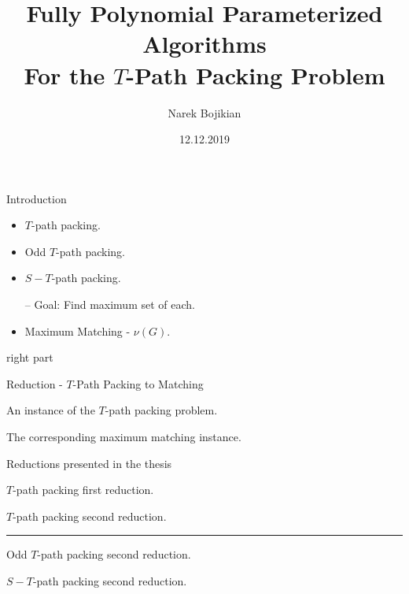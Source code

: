 \documentclass{beamer}
\title{Fully Polynomial Parameterized Algorithms\\For the $T$-Path Packing Problem} %
\author{Narek Bojikian} %
\institute[Hu-Berlin]
{
	Humboldt University of Berlin
}
\date{12.12.2019} %
\begin{document}
\begin{frame}
\titlepage %
\end{frame}
\begin{frame}[t]{Introduction}
	\vspace{10px}
	\begin{minipage}[t]{0.6\linewidth}
		\begin{itemize}[<+->]
			\item $T$-path packing.
			\item Odd $T$-path packing.
			\item $S-T$-path packing.
			\item[--] Goal: Find maximum set of each.
			\item Maximum Matching - $\nu(G)$.
		\end{itemize}
	\end{minipage}\hfill
	\begin{minipage}[t]{0.3\linewidth}
		\centering
		right part
	\end{minipage}
\end{frame}
\begin{frame}[t]{Reduction - $T$-Path Packing to Matching}
	\begin{minipage}[t][.4\textheight][t]{\linewidth}
		An instance of the $T$-path packing problem.
	\end{minipage}
	\hfill
	\begin{minipage}[t][.4\textheight][t]{\linewidth}
		The corresponding maximum matching instance.
	\end{minipage}
\end{frame}

\begin{frame}[t]{Reductions presented in the thesis}
	\begin{minipage}[t][.3\textheight][t]{\linewidth}
		\begin{minipage}[t][\textheight][t]{.45\linewidth}

			$T$-path packing first reduction.
			
		\end{minipage}
		\hfill
		\vline
		\hfill
		\begin{minipage}[t][\textheight][t]{.45\linewidth}
			$T$-path packing second reduction.
		\end{minipage}
	\end{minipage}
		\vfill
		\hrule
		\vfill
	\begin{minipage}[t][.3\textheight][t]{\linewidth}
		\begin{minipage}[t][\textheight][t]{.45\linewidth}
			Odd $T$-path packing second reduction.
		\end{minipage}
		\hfill
		\hfill
		\begin{minipage}[t][\textheight][t]{.45\linewidth}
			$S-T$-path packing second reduction.
		\end{minipage}
	\end{minipage}

\end{frame}
\end{document}
